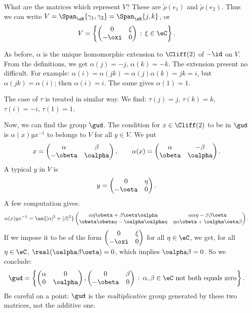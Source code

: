 What are the matrices which represent $V$? These are $\tilde\rho(e_1)$ and $\tilde\rho(e_2)$. Thus we can write $V=\Span_{\eR}\{\gamma_1,\gamma_2\}=\Span_{\eR}\{j,k\}$, or
\[
 V=\left\{\begin{pmatrix}
 0 & \xi \\
 -\oxi & 0
 \end{pmatrix}\,:\,\xi\in\eC\right\}.
\]

As before, $\alpha$ is the unique homomorphic extension to $\Cliff(2)$ of $-\id$ on $V$. From the definitions, we get $\alpha(j)=-j$, $\alpha(k)=-k$.
The extension present no difficult. For example: $\alpha(i)=\alpha(jk)=\alpha(j)\alpha(k)=jk=i$, but $\alpha(jk)=\alpha(i)$; then $\alpha(i)=i$. The same gives $\alpha(1)=1$.

The case of $\tau$ is treated in similar way. We find: $\tau(j)=j$, $\tau(k)=k$, $\tau(i)=-i$, $\tau(1)=1$.

Now, we can find the group $\gud$. The condition for $x\in\Cliff(2)$ to be in $\gud$ is $\alpha(x)yx^{-1}$ to belongs to $V$ for all $y\in V$. We put
\[ x=\begin{pmatrix}
\alpha & \beta \\
-\obeta & \oalpha
\end{pmatrix},\qquad\alpha(x)=\begin{pmatrix}
\alpha & -\beta \\
\obeta & \oalpha
\end{pmatrix}.\]
A typical $y$ in $V$ is
\[
 y=\begin{pmatrix}
 0 & \eta \\
 -\oeta & 0
 \end{pmatrix}.
\]
A few computation gives:
\[
 \alpha(x)yx^{-1}=\us{|\alpha|^2+|\beta|^2}\begin{pmatrix}
 \alpha\eta\obeta+\beta\oeta\oalpha & \alpha\alpha\eta-\beta\beta\oeta \\
 \obeta\obeta\eta-\oalpha\oalpha\eta & \eta\alpha\obeta+\oalpha\oeta\beta
 \end{pmatrix}.
\]
If we impose it to be of the form $\begin{pmatrix}
0 & \xi \\
-\oxi & 0
\end{pmatrix} $ for all $\eta\in\eC$, we get, for all $\eta\in\eC$, 
 $\real(\oalpha\beta\oeta)=0$, which implies $\oalpha\beta=0$. So we conclude:
\[
 \gud=\left\{\begin{pmatrix}
 \alpha & 0 \\
 0 & \oalpha
 \end{pmatrix}, \begin{pmatrix}
 0 & \beta \\
 -\obeta & 0
 \end{pmatrix}\,:\,\alpha,\beta\in\eC\textrm{ not both equals zero}\right\}.
\]
Be careful on a point: $\gud$ is the \emph{multiplicative} group generated by these two matrices, not the additive one.

